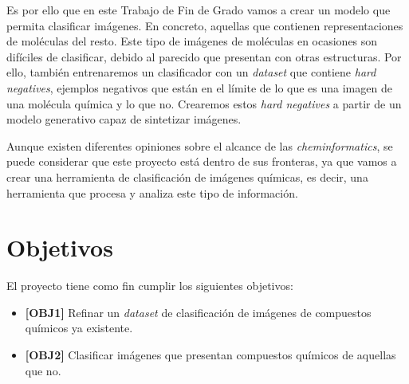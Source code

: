 Es por ello que en este Trabajo de Fin de Grado vamos a crear un modelo que permita clasificar imágenes. En concreto, aquellas que contienen representaciones de moléculas del resto. Este tipo de imágenes de moléculas en ocasiones son difíciles de clasificar, debido al parecido que presentan con otras estructuras. Por ello, también entrenaremos un clasificador con un \textit{dataset} que contiene \textit{hard negatives}, ejemplos negativos que están en el límite de lo que es una imagen de una molécula química y lo que no. Crearemos estos \textit{hard negatives} a partir de un modelo generativo capaz de sintetizar imágenes.


Aunque existen diferentes opiniones sobre el alcance de las \textit{cheminformatics}, se puede considerar que este proyecto está dentro de sus fronteras, ya que vamos a crear una herramienta de clasificación de imágenes químicas, es decir, una herramienta que procesa y analiza este tipo de información.

\section{Objetivos}
El proyecto tiene como fin cumplir los siguientes objetivos:

\begin{itemize}
    \item \textbf{[OBJ1]} Refinar un \textit{dataset} de clasificación de imágenes de compuestos químicos ya existente.
    \item \textbf{[OBJ2]} Clasificar imágenes que presentan compuestos químicos de aquellas que no.
\end{itemize}